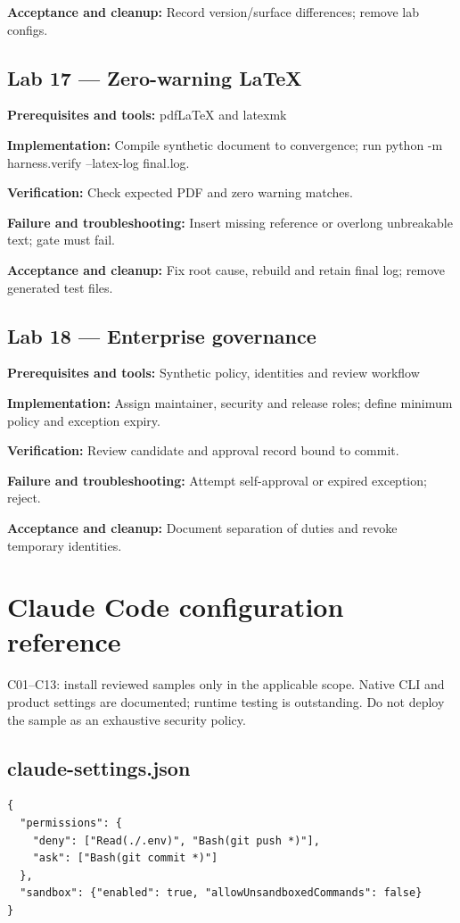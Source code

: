 \documentclass[11pt,letterpaper]{article}
\begin{document}
\textbf{Acceptance and cleanup:} Record version/surface differences; remove lab configs.

\subsection*{Lab 17 --- Zero-warning LaTeX}
\textbf{Prerequisites and tools:} pdfLaTeX and latexmk

\textbf{Implementation:} Compile synthetic document to convergence; run python -m harness.verify --latex-log final.log.

\textbf{Verification:} Check expected PDF and zero warning matches.

\textbf{Failure and troubleshooting:} Insert missing reference or overlong unbreakable text; gate must fail.

\textbf{Acceptance and cleanup:} Fix root cause, rebuild and retain final log; remove generated test files.

\subsection*{Lab 18 --- Enterprise governance}
\textbf{Prerequisites and tools:} Synthetic policy, identities and review workflow

\textbf{Implementation:} Assign maintainer, security and release roles; define minimum policy and exception expiry.

\textbf{Verification:} Review candidate and approval record bound to commit.

\textbf{Failure and troubleshooting:} Attempt self-approval or expired exception; reject.

\textbf{Acceptance and cleanup:} Document separation of duties and revoke temporary identities.

\clearpage\appendix
\clearpage\section{Claude Code configuration reference}
C01--C13: install reviewed samples only in the applicable scope. Native CLI and product settings are documented; runtime testing is outstanding. Do not deploy the sample as an exhaustive security policy.

\subsection*{claude-settings.json}
\begin{lstlisting}
{
  "permissions": {
    "deny": ["Read(./.env)", "Bash(git push *)"],
    "ask": ["Bash(git commit *)"]
  },
  "sandbox": {"enabled": true, "allowUnsandboxedCommands": false}
}
\end{lstlisting}
\end{document}
